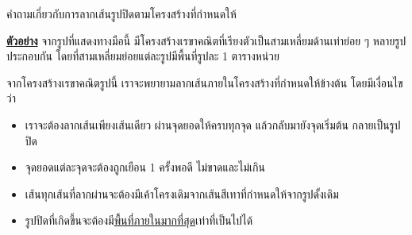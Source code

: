 \question{}

คำถามเกี่ยวกับการลากเส้นรูปปิดตามโครงสร้างที่กำหนดให้

\smallskip\noindent
\textbf{\uline{ตัวอย่าง}}\; จากรูปที่แสดงทางมือนี้
มีโครงสร้างเรขาคณิตที่เรียงตัวเป็นสามเหลี่ยมด้านเท่าย่อย ๆ หลายรูปประกอบกัน
โดยที่สามเหลี่ยมย่อยแต่ละรูปมีพื้นที่รูปละ 1 ตารางหน่วย

จากโครงสร้างเรขาคณิตรูปนี้ เราจะพยายามลากเส้นภายในโครงสร้างที่กำหนดให้ข้างต้น โดยมีเงื่อนไขว่า
\begin{itemize}
\item เราจะต้องลากเส้นเพียงเส้นเดียว ผ่านจุดยอดให้ครบทุกจุด แล้วกลับมายังจุดเริ่มต้น กลายเป็นรูปปิด
\item จุดยอดแต่ละจุดจะต้องถูกเยือน 1 ครั้งพอดี ไม่ขาดและไม่เกิน
\item เส้นทุกเส้นที่ลากผ่านจะต้องมีเค้าโครงเดิมจากเส้นสีเทาที่กำหนดให้จากรูปดั้งเดิม
\item รูปปิดที่เกิดขึ้นจะต้องมี\uline{พื้นที่ภายในมากที่สุด}เท่าที่เป็นไปได้
\end{itemize}


